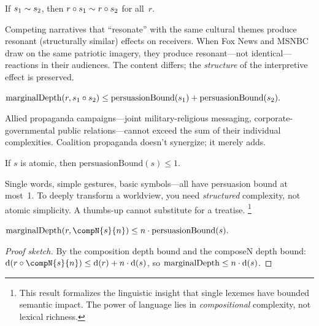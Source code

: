 \begin{theorem}
\label{thm:resonant-propaganda}
If $s_1\sim s_2$, then $r\circ s_1 \sim r\circ s_2$ for all~$r$.
\end{theorem}

Competing narratives that ``resonate'' with the same cultural themes produce
resonant (structurally similar) effects on receivers.  When Fox News and
MSNBC draw on the same patriotic imagery, they produce resonant---not
identical---reactions in their audiences.  The content differs; the
\emph{structure} of the interpretive effect is preserved.

\begin{theorem}
\label{thm:double-propagandist}
$\mathrm{marginalDepth}(r, s_1\circ s_2) \le
\mathrm{persuasionBound}(s_1) + \mathrm{persuasionBound}(s_2).$
\end{theorem}

Allied propaganda campaigns---joint military-religious messaging,
corporate-governmental public relations---cannot exceed the sum of their
individual complexities.  Coalition propaganda doesn't synergize; it merely
adds.

\begin{theorem}
\label{thm:atomic-persuasion}
If $s$ is atomic, then $\mathrm{persuasionBound}(s) \le 1$.
\end{theorem}

Single words, simple gestures, basic symbols---all have persuasion bound at
most~1.  To deeply transform a worldview, you need \emph{structured}
complexity, not atomic simplicity.  A thumbs-up cannot substitute for a
treatise.%
\footnote{This result formalizes the linguistic insight that single lexemes
have bounded semantic impact.  The power of language lies in
\emph{compositional} complexity, not lexical richness.}

\begin{theorem}
\label{thm:iterated-propaganda}
$\mathrm{marginalDepth}(r, \compN{s}{n}) \le n\cdot\mathrm{persuasionBound}(s).$
\end{theorem}

\begin{proof}[Proof sketch]
By the composition depth bound and the composeN depth bound:
$\depth(r\compose\compN{s}{n})\le\depth(r)+n\cdot\depth(s)$,
so $\mathrm{marginalDepth}\le n\cdot\operatorname{d}(s)$.
\end{proof}

